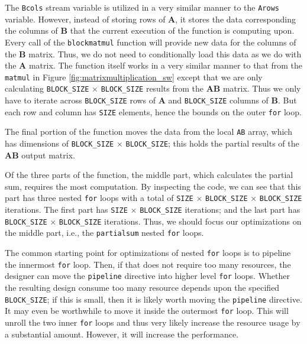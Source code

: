 The \lstinline{Bcols} stream variable is utilized in a very similar manner to the \lstinline{Arows} variable. However, instead of storing rows of $\mathbf{A}$, it stores the data corresponding the columns of $\mathbf{B}$ that the current execution of the function is computing upon. Every call of the \lstinline{blockmatmul} function will provide new data for the columns of the $\mathbf{B}$ matrix. Thus, we do not need to conditionally load this data as we do with the $\mathbf{A}$ matrix. The function itself works in a very similar manner to that from the \lstinline{matmul} in Figure \ref{fig:matrixmultiplication_sw} except that we are only calculating \lstinline{BLOCK_SIZE} $\times$ \lstinline{BLOCK_SIZE} results from the $\mathbf{AB}$ matrix. Thus we only have to iterate across \lstinline{BLOCK_SIZE} rows of $\mathbf{A}$ and \lstinline{BLOCK_SIZE} columns of $\mathbf{B}$. But each row and column has \lstinline{SIZE} elements, hence the bounds on the outer \lstinline{for} loop. 

The final portion of the function moves the data from the local \lstinline{AB} array, which has dimensions of \lstinline{BLOCK_SIZE} $\times$ \lstinline{BLOCK_SIZE}; this holds the partial results of the $\mathbf{AB}$ output matrix. %

Of the three parts of the function, the middle part, which calculates the partial sum, requires the most computation. By inspecting the code, we can see that this part has three nested \lstinline{for} loops with a total of \lstinline{SIZE} $\times$ \lstinline{BLOCK_SIZE} $\times$ \lstinline{BLOCK_SIZE} iterations. The first part has \lstinline{SIZE} $\times$ \lstinline{BLOCK_SIZE} iterations; and the last part has \lstinline{BLOCK_SIZE} $\times$ \lstinline{BLOCK_SIZE} iterations. Thus, we should focus our optimizations on the middle part, i.e., the \lstinline{partialsum} nested \lstinline{for} loops.

The common starting point for optimizations of nested \lstinline{for} loops is to pipeline the innermost \lstinline{for} loop. Then, if that does not require too many resources, the designer can move the \lstinline{pipeline} directive into higher level \lstinline{for} loops. Whether the resulting design consume too many resource depends upon the specified \lstinline{BLOCK_SIZE}; if this is small, then it is likely worth moving the \lstinline{pipeline} directive. It may even be worthwhile to move it inside the outermost \lstinline{for} loop. This will unroll the two inner \lstinline{for} loops and thus very likely increase the resource usage by a substantial amount. However, it will increase the performance.

